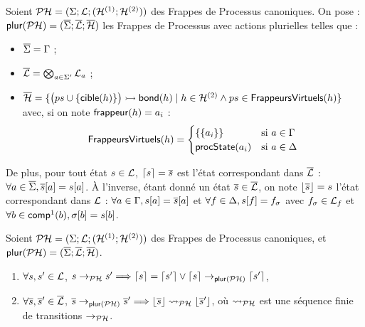 \begin{definition}
  Soient $\mathcal{PH} = (\Sigma; \mathcal{L}; (\mathcal{H}^{(1)}; \mathcal{H}^{(2)}))$ des Frappes de Processus canoniques.
  On pose : $\mathsf{plur}(\mathcal{PH}) = (\overline{\Sigma}; \overline{\mathcal{L}}; \overline{\mathcal{H}})$ les Frappes de Processus
  avec actions plurielles telles que :
  \begin{itemize}
    \item $\overline{\Sigma} = \Gamma$ ;
    \item $\overline{\mathcal{L}} = \bigotimes_{a \in \Sigma'} \mathcal{L}_a$ ;
    \item $\overline{\mathcal{H}} = \{ \mbox{$\big( ps \cup \{ \mathsf{cible}(h) \} \big) \rightarrowtail \mathsf{bond}(h)$}
      \mid h \in \mathcal{H}^{(2)} \wedge ps \in \mathsf{FrappeursVirtuels}(h) \}$
    avec, si on note $\mathsf{frappeur}(h) = a_i$ :
    \[\mathsf{FrappeursVirtuels}(h) =
      \begin{cases}
        \{ \{ a_i \} \} & \text{si } a \in \Gamma \\
        \mathsf{procState}(a_i) & \text{si } a \in \Delta
      \end{cases}\]
  \end{itemize}
  De plus, pour tout état $s \in \mathcal{L}$,
  $\lceil s \rceil = \overline{s}$ est l'état correspondant dans $\overline{\mathcal{L}}$ :
  $\forall a \in \overline{\Sigma}, {\overline{s}[a]} = {s[a]}$.
  À l'inverse, étant donné un état $\overline{s} \in \overline{\mathcal{L}}$,
  on note $\lfloor \overline{s} \rfloor = s$ l'état correspondant dans $\mathcal{L}$ :
  $\forall a \in \Gamma, {s[a]} = {\overline{s}[a]}$
  et $\forall f \in \Delta, {s[f]} = f_\sigma$
  avec $f_\sigma \in \mathcal{L}_f$
  et $\forall b \in \mathsf{comp}^1(b), {\sigma[b]} = {s[b]}$.
\end{definition}

\begin{theorem}[$\PH \approx \PHmult(\PH)$]
  Soient $\mathcal{PH} = (\Sigma; \mathcal{L}; (\mathcal{H}^{(1)}; \mathcal{H}^{(2)}))$ des Frappes de Processus canoniques,
  et $\mathsf{plur}(\mathcal{PH}) = (\overline{\Sigma}; \overline{\mathcal{L}}; \overline{\mathcal{H}})$.
  \begin{enumerate}
    \item \label{bisimulph2phm} $\forall s, s' \in \mathcal{L}$,
      $s \rightarrow_{\mathcal{PH}} s' \Longrightarrow
      \lceil s \rceil = \lceil s' \rceil \vee \lceil s \rceil \rightarrow_{\mathsf{plur}(\mathcal{PH})} \lceil s' \rceil$,
    \item \label{bisimulphm2ph} $\forall \overline{s}, \overline{s}' \in \overline{\mathcal{L}}$,
      $\overline{s} \rightarrow_{\mathsf{plur}(\mathcal{PH})} \overline{s}' \Longrightarrow
      \lfloor \overline{s} \rfloor \rightsquigarrow_{\mathcal{PH}} \lfloor \overline{s}' \rfloor$,
      où $\rightsquigarrow_{\mathcal{PH}}$ est une séquence finie de transitions $\rightarrow_{\mathcal{PH}}$.
  \end{enumerate}
\end{theorem}

